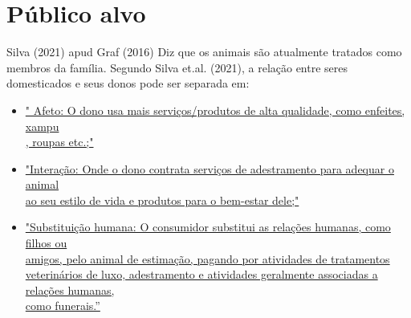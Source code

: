 \section{Público alvo}
Silva (2021) apud Graf (2016) Diz que os animais são atualmente tratados como membros da família. Segundo Silva et.al. (2021), a relação entre seres domesticados e seus donos pode ser separada em:
\begin{itemize}
    \item \underline{" Afeto: O dono usa mais serviços/produtos de alta qualidade, como enfeites, xampu\\, roupas etc.;" }
    \item \underline{"Interação: Onde o dono contrata serviços de adestramento para adequar o animal \\ao seu estilo de vida e produtos para o bem-estar dele;"}
    \item \underline{"Substituição humana: O consumidor substitui as relações humanas, como filhos ou \\amigos, pelo animal de estimação, pagando por atividades de tratamentos \\veterinários de luxo, adestramento e atividades geralmente associadas a relações humanas,\\ como funerais.”}
\end{itemize}



